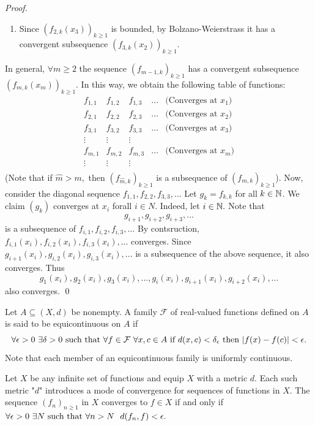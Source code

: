 \begin{proof}
\begin{enumerate}[$*)$]
        \item Since $(f_{2,k}(x_3))_{k \geq 1}$ is bounded, by Bolzano-Weierstrass it has a convergent subsequence $(f_{3,k}(x_2))_{k\geq 1}$.
    \end{enumerate}
    In general, $\forall m \geq 2$ the sequence $(f_{m-1,k})_{k\geq 1}$ has a convergent subsequence $(f_{m,k}(x_m))_{k\geq 1}$. In this way, we obtain the following table of functions:
    \[
    \begin{array}{ccccc}
        f_{1,1} & f_{1,2} & f_{1,3} & \dots & \text{(Converges at $x_1$)} \\[6pt]
        f_{2,1} & f_{2,2} & f_{2,3} & \dots & \text{(Converges at $x_2$)} \\[6pt]
        f_{3,1} & f_{3,2} & f_{3,3} & \dots & \text{(Converges at $x_3$)} \\[6pt]
        \vdots & \vdots & \vdots &  &   \\[6pt]
        f_{m,1} & f_{m,2} & f_{m,3} & \dots & \text{(Converges at $x_m$)} \\[6pt]
        \vdots & \vdots & \vdots &  &   \\[6pt]
    \end{array}
    \]
    (Note that if $\hat{m} > m,$ then $(f_{\hat{m},k})_{k\geq 1}$ is a subsequence of $(f_{m,k})_{k\geq 1}$). Now, consider the diagonal sequence $f_{1,1}, f_{2,2}, f_{3,3},...$ Let $g_k = f_{k,k}$ for all $ k \in \mathbb{N}$. We claim $(g_k)$ converges at $x_i$ forall $i \in N.$ Indeed, let $i \in \mathbb{N}.$ Note that
    $$g_{i+1}, g_{i+2}, g_{i+3},...$$
    is a subsequence of $f_{i,1}, f_{i,2},f_{i,3},...$ By contsruction, $f_{i,1}(x_i), f_{i,2}(x_i), f_{i,3}(x_i),...$ converges. Since $g_{i+1}(x_i), g_{i,2}(x_i),g_{i,3}(x_i),...$ is a subsequence of the above sequence, it also converges. Thus
    $$g_1(x_i), g_2(x_i), g_3(x_i),..., g_i(x_i), g_{i+1}(x_i), g_{i+2}(x_i),...$$
    also converges.
    \qed
\end{proof}

\begin{remark}
    Let $A\subseteq (X,d)$ be nonempty. A family $\mathcal{F}$ of real-valued functions defined on $A$ is said to be equicontinuous on $A$ if
    $$\forall \epsilon > 0 ~\exists \delta > 0 \text{ such that } \forall f \in \mathcal{F} ~\forall x,c \in A \text{ if $d(x,c) < \delta_\epsilon$ then $|f(x) - f(c)| <\epsilon.$}$$
    Note that each member of an equicontinuous family is uniformly continuous.
\end{remark}

\begin{remark}
    Let $X$ be any infinite set of functions and equip $X$ with a metric $d$. Each such metric "$d$" introduces a mode of convergence for sequences of functions in $X$. The sequence $(f_n)_{n\geq 1}$ in $X$ converges to $f \in X$ if and only if $\forall \epsilon > 0 ~\exists N \text{ such that } \forall n > N ~~d(f_n,f) < \epsilon.$
\end{remark}


